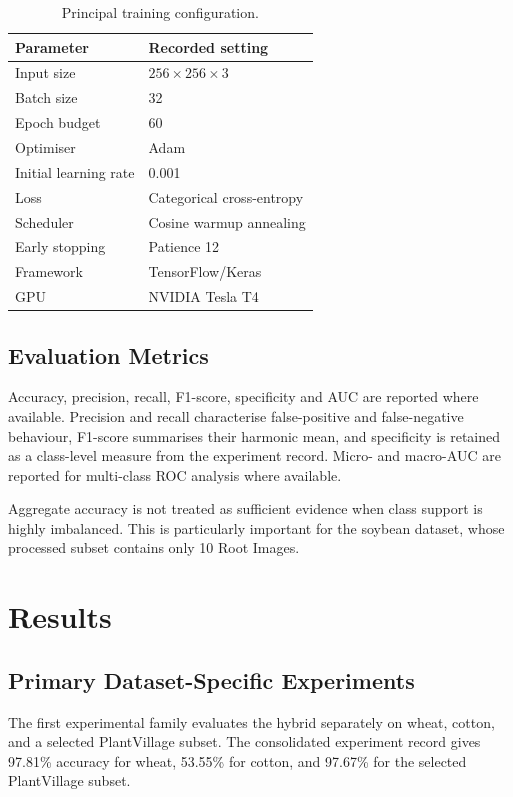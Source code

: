 \documentclass[a4paper,fleqn]{cas-dc}
\begin{document}
\begin{table}[!t]
\centering
\caption{Principal training configuration.}
\label{tab:hyper}
\small
\begin{tabular}{ll}
\toprule
Parameter & Recorded setting \\
\midrule
Input size & $256\times256\times3$ \\
Batch size & 32 \\
Epoch budget & 60 \\
Optimiser & Adam \\
Initial learning rate & 0.001 \\
Loss & Categorical cross-entropy \\
Scheduler & Cosine warmup annealing \\
Early stopping & Patience 12 \\
Framework & TensorFlow/Keras \\
GPU & NVIDIA Tesla T4 \\
\bottomrule
\end{tabular}
\end{table}

\subsection{Evaluation Metrics}
Accuracy, precision, recall, F1-score, specificity and AUC are reported where available. Precision and recall characterise false-positive and false-negative behaviour, F1-score summarises their harmonic mean, and specificity is retained as a class-level measure from the experiment record. Micro- and macro-AUC are reported for multi-class ROC analysis where available.

Aggregate accuracy is not treated as sufficient evidence when class support is highly imbalanced. This is particularly important for the soybean dataset, whose processed subset contains only 10 Root Images.

\section{Results}
\subsection{Primary Dataset-Specific Experiments}
The first experimental family evaluates the hybrid separately on wheat, cotton, and a selected PlantVillage subset. The consolidated experiment record gives 97.81\% accuracy for wheat, 53.55\% for cotton, and 97.67\% for the selected PlantVillage subset.
\end{document}
